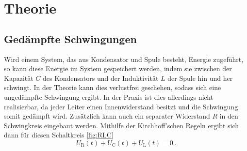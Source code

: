 \section{Theorie}
\label{sec:Theorie}
\subsection{Gedämpfte Schwingungen}
\label{sec:Gedämpfte_Schwingungen}

Wird einem System, das aus Kondensator und Spule besteht, Energie zugeführt, so kann
diese Energie im System gespeichert werden, indem sie zwischen der Kapazität $C$
des Kondensators und der Induktivität $L$ der Spule hin und her schwingt. In der
Theorie kann dies verlustfrei geschehen, sodass sich eine ungedämpfte Schwingung
ergibt. In der Praxis ist dies allerdings nicht realisierbar, da jeder Leiter einen
Innenwiderstand besitzt und die Schwingung somit gedämpft wird. Zusätzlich kann auch
ein separater Widerstand $R$ in den Schwingkreis eingebaut werden. Mithilfe der Kirchhoff'schen
Regeln ergibt sich dann für diesen Schaltkreis \ref{fig:RLC}
\begin{equation}
  U_{\text{R}}(t)+U_{\text{C}}(t)+U_{\text{L}}(t)=0 \,.
\end{equation}

